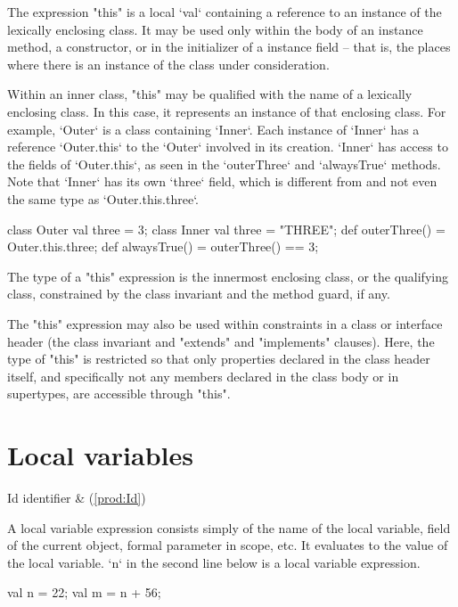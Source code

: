 The expression \xcd"this" is a  local \xcd`val` containing a reference
to an instance of the lexically enclosing class.
It may be used only within the body of an instance method, a
constructor, or in the initializer of a instance field -- that is, the places
where there is an instance of the class under consideration.

Within an inner class, \xcd"this" may be qualified with the
name of a lexically enclosing class.  In this case, it
represents an instance of that enclosing class.  
For example, \xcd`Outer` is a class containing \xcd`Inner`.  Each instance of
\xcd`Inner` has a reference \xcd`Outer.this` to the \xcd`Outer` involved in its
creation.  \xcd`Inner` has access to the fields of \xcd`Outer.this`, as seen
in the \xcd`outerThree` and \xcd`alwaysTrue` methods.  Note that \xcd`Inner`
has its own \xcd`three` field, which is different from and not even the same
type as \xcd`Outer.this.three`. 
\begin{xten}
class Outer {
  val three = 3;
  class Inner {
     val three = "THREE";
     def outerThree() = Outer.this.three;
     def alwaysTrue() = outerThree() == 3;
  }
}
\end{xten}
%

The type of a \xcd"this" expression is the
innermost enclosing class, or the qualifying class,
constrained by the class invariant and the
method guard, if any.

The \xcd"this" expression may also be used within constraints in
a class or interface header (the class invariant and
\xcd"extends" and \xcd"implements" clauses).  Here, the type of
\xcd"this" is restricted so that only properties declared in the
class header itself, and specifically not any members declared in the class
body or in supertypes, are accessible through \xcd"this".

\section{Local variables}

\begin{bbgrammar}
                  Id \: identifier & (\ref{prod:Id}) \\
\end{bbgrammar}

A local variable expression consists simply of the name of the local variable,
field of the current object, formal parameter in scope, etc. It evaluates to
the value of the local variable. \xcd`n` in the second line below is a local
variable expression. 
\begin{xten}
val n = 22;
val m = n + 56;
\end{xten}



